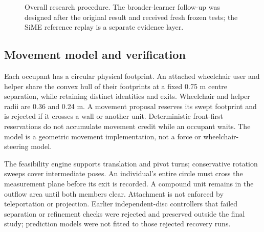 \begin{figure}[!t]\centering
{}
\caption{Overall research procedure. The broader-learner follow-up was designed after the original result and received fresh frozen tests; the SiME reference replay is a separate evidence layer.}
\label{fig:workflow}
\end{figure}


\subsection{Movement model and verification}
Each occupant has a circular physical footprint. An attached wheelchair user and helper share the convex hull of their footprints at a fixed 0.75 m centre separation, while retaining distinct identities and exits. Wheelchair and helper radii are 0.36 and 0.24 m. A movement proposal reserves its swept footprint and is rejected if it crosses a wall or another unit. Deterministic front-first reservations do not accumulate movement credit while an occupant waits. The model is a geometric movement implementation, not a force or wheelchair-steering model.

The feasibility engine supports translation and pivot turns; conservative rotation sweeps cover intermediate poses. An individual's entire circle must cross the measurement plane before its exit is recorded. A compound unit remains in the outflow area until both members clear. Attachment is not enforced by teleportation or projection. Earlier independent-disc controllers that failed separation or refinement checks were rejected and preserved outside the final study; prediction models were not fitted to those rejected recovery runs.

